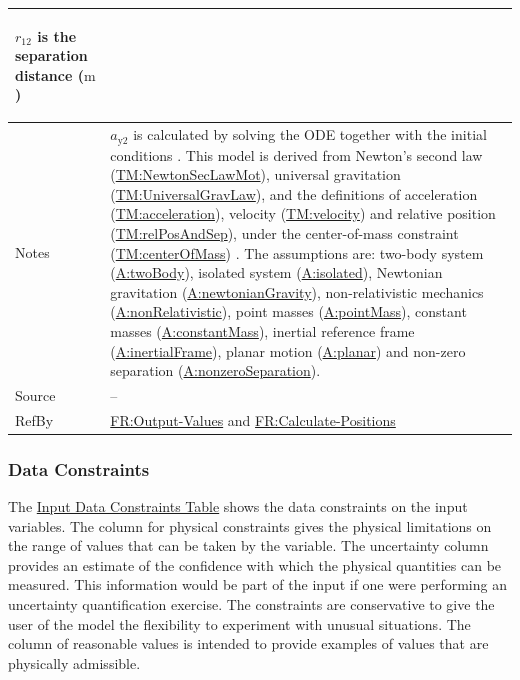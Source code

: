 \documentclass[12pt]{article}
\begin{document}
\begin{minipage}{\textwidth}
\begin{tabular}{>{\raggedright}p{}>{\raggedright\arraybackslash}p{}}
\begin{symbDescription}
              \item{${r_{12}}$ is the separation distance (${\text{m}}$)}
              \end{symbDescription}
\\ \midrule
Notes & ${a_{\text{y}2}}$ is calculated by solving the ODE together with the initial conditions . This model is derived from Newton's second law (\hyperref[TM:NewtonSecLawMot]{TM:NewtonSecLawMot}), universal gravitation (\hyperref[TM:UniversalGravLaw]{TM:UniversalGravLaw}), and the definitions of acceleration (\hyperref[TM:acceleration]{TM:acceleration}), velocity (\hyperref[TM:velocity]{TM:velocity}) and relative position (\hyperref[TM:relPosAndSep]{TM:relPosAndSep}), under the center-of-mass constraint (\hyperref[TM:centerOfMass]{TM:centerOfMass}) . The assumptions are: two-body system (\hyperref[twoBody]{A:twoBody}), isolated system (\hyperref[isolated]{A:isolated}), Newtonian gravitation (\hyperref[newtonianGravity]{A:newtonianGravity}), non-relativistic mechanics (\hyperref[nonRelativistic]{A:nonRelativistic}), point masses (\hyperref[pointMass]{A:pointMass}), constant masses (\hyperref[constantMass]{A:constantMass}), inertial reference frame (\hyperref[inertialFrame]{A:inertialFrame}), planar motion (\hyperref[planar]{A:planar}) and non-zero separation (\hyperref[nonzeroSeparation]{A:nonzeroSeparation}).
        
\\ \midrule
Source & --
         
\\ \midrule
RefBy & \hyperref[outputValues]{FR:Output-Values} and \hyperref[calcPositions]{FR:Calculate-Positions}
        
\\ \bottomrule
\end{tabular}
\end{minipage}

\subsubsection{Data Constraints}
\label{Sec:DataConstraints}
The \hyperref[Table:InDataConstraints]{Input Data Constraints Table} shows the data constraints on the input variables. The column for physical constraints gives the physical limitations on the range of values that can be taken by the variable. The uncertainty column provides an estimate of the confidence with which the physical quantities can be measured. This information would be part of the input if one were performing an uncertainty quantification exercise. The constraints are conservative to give the user of the model the flexibility to experiment with unusual situations. The column of reasonable values is intended to provide examples of values that are physically admissible.
\end{document}
